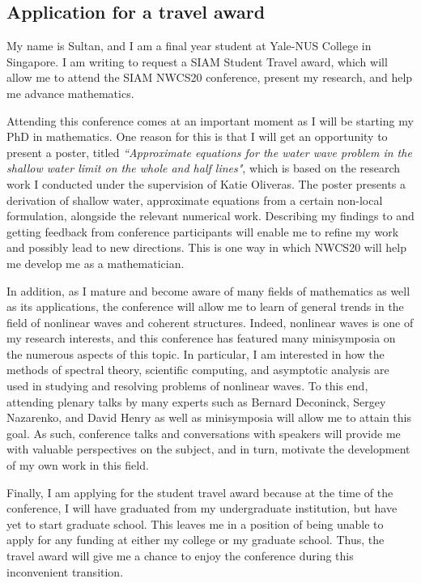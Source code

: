 \documentclass[10pt,reqno,oneside,a4paper]{article}
\author{Sultan Aitzhan}
\date{\today}
\begin{document}
\thispagestyle{fancy}

\subsection*{Application for a travel award}
My name is Sultan, and I am a final year student at Yale-NUS College in Singapore. I am writing to request a SIAM Student Travel award, which will allow me to attend the SIAM NWCS20 conference, present my research, and help me advance mathematics. 

Attending this conference comes at an important moment as I will be starting my PhD in mathematics. 
One reason for this is that I will get an opportunity to present a poster, titled \textit{“Approximate equations for the water wave problem in the shallow water limit on the whole and half lines"}, which is based on the research work I conducted under the supervision of Katie Oliveras. The poster presents a derivation of shallow water, approximate equations from a certain non-local formulation, alongside the relevant numerical work. Describing my findings to and getting feedback from conference participants will enable me to refine my work and possibly lead to new directions. This is one way in which NWCS20 will help me develop me as a mathematician.

In addition, as I mature and become aware of many fields of mathematics as well as its applications, the conference will allow me to learn of general trends in the field of nonlinear waves and coherent structures. Indeed, nonlinear waves is one of my research interests, and this conference has featured many minisymposia on the numerous aspects of this topic. In particular, I am interested in how the methods of spectral theory, scientific computing, and asymptotic analysis are used in studying and resolving problems of nonlinear waves. To this end, attending plenary talks by many experts such as Bernard Deconinck, Sergey Nazarenko, and David Henry as well as minisymposia will allow me to attain this goal. As such, conference talks and conversations with speakers will provide me with valuable perspectives on the subject, and in turn, motivate the development of my own work in this field. 

Finally, I am applying for the student travel award because at the time of the conference, I will have graduated from my undergraduate institution, but have yet to start graduate school. This leaves me in a position of being unable to apply for any funding at either my college or my graduate school. Thus, the travel award will give me a chance to enjoy the conference during this inconvenient transition. 
\end{document}
